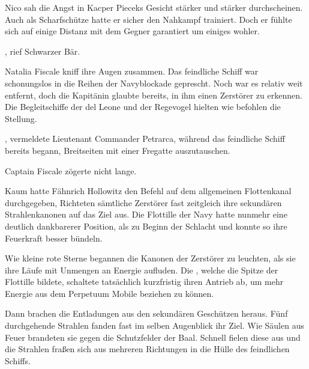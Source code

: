 \par

Nico sah die Angst in Kacper Pieceks Gesicht stärker und stärker durchscheinen. Auch als Scharfschütze hatte er sicher den Nahkampf trainiert. Doch er fühlte sich auf einige Distanz mit dem Gegner garantiert um einiges wohler.

\par

, rief Schwarzer Bär. 

\par

Natalia Fiscale kniff ihre Augen zusammen. Das feindliche Schiff war schonungslos in die Reihen der Navyblockade geprescht. Noch war es relativ weit entfernt, doch die Kapitänin glaubte bereits, in ihm einen Zerstörer zu erkennen. Die Begleitschiffe der  del Leone und der Regevogel hielten wie befohlen die Stellung.

\par

, vermeldete Lieutenant Commander Petrarca, während das feindliche Schiff bereits begann, Breitseiten mit einer Fregatte auszutauschen.

\par

Captain Fiscale zögerte nicht lange. 

\par

Kaum hatte Fähnrich Hollowitz den Befehl auf dem allgemeinen Flottenkanal durchgegeben, Richteten sämtliche Zerstörer fast zeitgleich ihre sekundären Strahlenkanonen auf das Ziel aus. Die Flottille der Navy hatte nunmehr eine deutlich dankbarerer Position, als zu Beginn der Schlacht und konnte so ihre Feuerkraft besser bündeln.

\par

Wie kleine rote Sterne begannen die Kanonen der Zerstörer zu leuchten, als sie ihre Läufe mit Unmengen an Energie aufluden. Die , welche die Spitze der Flottille bildete, schaltete tatsächlich kurzfristig ihren Antrieb ab, um mehr Energie aus dem Perpetuum Mobile beziehen zu können.

\par

Dann brachen die Entladungen aus den sekundären Geschützen heraus. Fünf durchgehende Strahlen fanden fast im selben Augenblick ihr Ziel. Wie Säulen aus Feuer brandeten sie gegen die Schutzfelder der Baal. Schnell fielen diese aus und die Strahlen fraßen sich aus mehreren Richtungen in die Hülle des feindlichen Schiffs.

